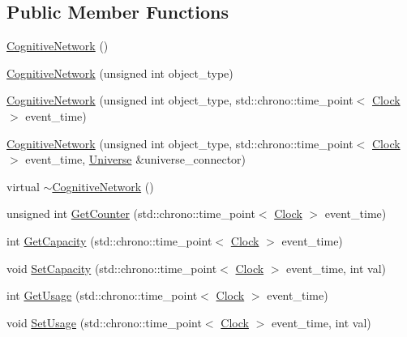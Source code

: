 \subsection*{Public Member Functions}
\begin{DoxyCompactItemize}
\item 
\mbox{\hyperlink{classCognitiveNetwork_a3daddb316744336648d317e7f71ed371}{Cognitive\+Network}} ()
\item 
\mbox{\hyperlink{classCognitiveNetwork_a167b15e33bcbca43cb0a516159e890f2}{Cognitive\+Network}} (unsigned int object\+\_\+type)
\item 
\mbox{\hyperlink{classCognitiveNetwork_ac7ba285d3468a929dac88756a2c4e4f9}{Cognitive\+Network}} (unsigned int object\+\_\+type, std\+::chrono\+::time\+\_\+point$<$ \mbox{\hyperlink{universe_8h_a0ef8d951d1ca5ab3cfaf7ab4c7a6fd80}{Clock}} $>$ event\+\_\+time)
\item 
\mbox{\hyperlink{classCognitiveNetwork_a6ec49dcc8cc58cded71983291629179c}{Cognitive\+Network}} (unsigned int object\+\_\+type, std\+::chrono\+::time\+\_\+point$<$ \mbox{\hyperlink{universe_8h_a0ef8d951d1ca5ab3cfaf7ab4c7a6fd80}{Clock}} $>$ event\+\_\+time, \mbox{\hyperlink{classUniverse}{Universe}} \&universe\+\_\+connector)
\item 
virtual \mbox{\hyperlink{classCognitiveNetwork_a17142cc6f0bb3894e63f6c66fa401778}{$\sim$\+Cognitive\+Network}} ()
\item 
unsigned int \mbox{\hyperlink{classCognitiveNetwork_a160bb447671609eb14b1b8043639ac74}{Get\+Counter}} (std\+::chrono\+::time\+\_\+point$<$ \mbox{\hyperlink{universe_8h_a0ef8d951d1ca5ab3cfaf7ab4c7a6fd80}{Clock}} $>$ event\+\_\+time)
\item 
int \mbox{\hyperlink{classCognitiveNetwork_a6bb3fc06029c260dd658d0db072625a7}{Get\+Capacity}} (std\+::chrono\+::time\+\_\+point$<$ \mbox{\hyperlink{universe_8h_a0ef8d951d1ca5ab3cfaf7ab4c7a6fd80}{Clock}} $>$ event\+\_\+time)
\item 
void \mbox{\hyperlink{classCognitiveNetwork_a055b3711835b8d134356298f8975f04d}{Set\+Capacity}} (std\+::chrono\+::time\+\_\+point$<$ \mbox{\hyperlink{universe_8h_a0ef8d951d1ca5ab3cfaf7ab4c7a6fd80}{Clock}} $>$ event\+\_\+time, int val)
\item 
int \mbox{\hyperlink{classCognitiveNetwork_ad293916cfa0e454ef40d7e228d0dcba3}{Get\+Usage}} (std\+::chrono\+::time\+\_\+point$<$ \mbox{\hyperlink{universe_8h_a0ef8d951d1ca5ab3cfaf7ab4c7a6fd80}{Clock}} $>$ event\+\_\+time)
\item 
void \mbox{\hyperlink{classCognitiveNetwork_a8b6b4afc47df279604be13bce77f5b0a}{Set\+Usage}} (std\+::chrono\+::time\+\_\+point$<$ \mbox{\hyperlink{universe_8h_a0ef8d951d1ca5ab3cfaf7ab4c7a6fd80}{Clock}} $>$ event\+\_\+time, int val)

\end{DoxyCompactItemize}
